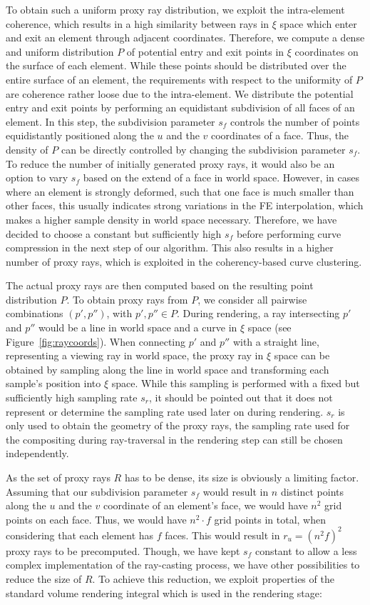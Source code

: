 \documentclass[review,journal]{vgtc}         %
\begin{document}
To obtain such a uniform proxy ray distribution, we exploit the intra-element coherence, which results in a high similarity between rays in $\xi$ space which enter and exit an element through adjacent coordinates. Therefore, we compute a dense and uniform distribution $P$ of potential entry and exit points in $\xi$ coordinates on the surface of each element. While these points should be distributed over the entire surface of an element, the requirements with respect to the uniformity of $P$ are coherence rather loose due to the intra-element. We distribute the potential entry and exit points by performing an equidistant subdivision of all faces of an element. In this step, the subdivision parameter $s_f$ controls the number of points equidistantly positioned along the $u$ and the $v$ coordinates of a face. Thus, the density of $P$ can be directly controlled by changing the subdivision parameter $s_f$. To reduce the number of initially generated proxy rays, it would also be an option to vary $s_f$ based on the extend of a face in world space. However, in cases where an element is strongly deformed, such that one face is much smaller than other faces, this usually indicates strong variations in the FE interpolation, which makes a higher sample density in world space necessary. Therefore, we have decided to choose a constant but sufficiently high $s_f$ before performing curve compression in the next step of our algorithm. This also results in a higher number of proxy rays, which is exploited in the coherency-based curve clustering.

The actual proxy rays are then computed based on the resulting point distribution $P$. To obtain proxy rays from $P$, we consider all pairwise combinations $(p',p'')$, with $p',p'' \in P$. During rendering, a ray intersecting $p'$ and $p''$ would be a line in world space and a curve in $\xi$ space (see Figure~\ref{fig:raycoords}). When connecting $p'$ and $p''$ with a straight line, representing a viewing ray in world space, the proxy ray in $\xi$ space can be obtained by sampling along the line in world space and transforming each sample's position into $\xi$ space. While this sampling is performed with a fixed but sufficiently high sampling rate $s_r$, it should be pointed out that it does not represent or determine the sampling rate used later on during rendering. $s_r$ is only used to obtain the geometry of the proxy rays, the sampling rate used for the compositing during ray-traversal in the rendering step can still be chosen independently.

As the set of proxy rays $R$ has to be dense, its size is obviously a limiting factor. Assuming that our subdivision parameter $s_f$ would result in $n$ distinct points along the $u$ and the $v$ coordinate of an element's face, we would have $n^2$ grid points on each face. Thus, we would have $n^2 \cdot f$ grid points in total, when considering that each element has $f$ faces. This would result in $r_u = (n^2 f)^2$ proxy rays to be precomputed. Though, we have kept $s_f$ constant to allow a less complex implementation of the ray-casting process, we have other possibilities to reduce the size of $R$. To achieve this reduction, we exploit properties of the standard volume rendering integral which is used in the rendering stage:
\end{document}
